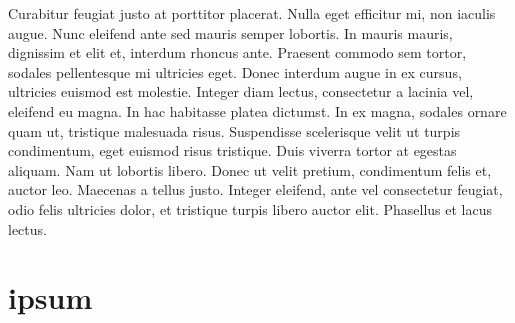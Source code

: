 	Curabitur feugiat justo at porttitor placerat. Nulla eget efficitur mi, non iaculis augue. Nunc eleifend ante sed mauris semper lobortis. In mauris mauris, dignissim et elit et, interdum rhoncus ante. Praesent commodo sem tortor, sodales pellentesque mi ultricies eget. Donec interdum augue in ex cursus, ultricies euismod est molestie. Integer diam lectus, consectetur a lacinia vel, eleifend eu magna. In hac habitasse platea dictumst. In ex magna, sodales ornare quam ut, tristique malesuada risus. Suspendisse scelerisque velit ut turpis condimentum, eget euismod risus tristique. Duis viverra tortor at egestas aliquam. Nam ut lobortis libero. Donec ut velit pretium, condimentum felis et, auctor leo. Maecenas a tellus justo. Integer eleifend, ante vel consectetur feugiat, odio felis ultricies dolor, et tristique turpis libero auctor elit. Phasellus et lacus lectus.   

	\section*{ipsum}
	
